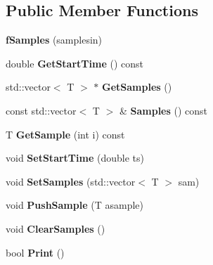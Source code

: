 \subsection*{Public Member Functions}
\begin{DoxyCompactItemize}
\item 
\hypertarget{classWaveform_a68f36ac9c005ddcbf426a62be2628620}{
{\bfseries fSamples} (samplesin)}
\label{classWaveform_a68f36ac9c005ddcbf426a62be2628620}

\item 
\hypertarget{classWaveform_abb0cebd383b7cfeb84169acb75dd3cc6}{
double {\bfseries GetStartTime} () const }
\label{classWaveform_abb0cebd383b7cfeb84169acb75dd3cc6}

\item 
\hypertarget{classWaveform_a4f146530e8336f402b1d47a2b1b0fae8}{
std::vector$<$ T $>$ $\ast$ {\bfseries GetSamples} ()}
\label{classWaveform_a4f146530e8336f402b1d47a2b1b0fae8}

\item 
\hypertarget{classWaveform_ac43b148d094b815f0eab3e516a0159c3}{
const std::vector$<$ T $>$ \& {\bfseries Samples} () const }
\label{classWaveform_ac43b148d094b815f0eab3e516a0159c3}

\item 
\hypertarget{classWaveform_a93fd6a1de144622e55fa1144159fd8da}{
T {\bfseries GetSample} (int i) const }
\label{classWaveform_a93fd6a1de144622e55fa1144159fd8da}

\item 
\hypertarget{classWaveform_ad8b5b17cc6d44e528abdd97adead95d4}{
void {\bfseries SetStartTime} (double ts)}
\label{classWaveform_ad8b5b17cc6d44e528abdd97adead95d4}

\item 
\hypertarget{classWaveform_a5505b4a4e14e80edb335b71e3606d815}{
void {\bfseries SetSamples} (std::vector$<$ T $>$ sam)}
\label{classWaveform_a5505b4a4e14e80edb335b71e3606d815}

\item 
\hypertarget{classWaveform_a09d5b4af62453d4a2d0bdbc5c04d9961}{
void {\bfseries PushSample} (T asample)}
\label{classWaveform_a09d5b4af62453d4a2d0bdbc5c04d9961}

\item 
\hypertarget{classWaveform_a9607cc7f4438c86663662ade5093f0f6}{
void {\bfseries ClearSamples} ()}
\label{classWaveform_a9607cc7f4438c86663662ade5093f0f6}

\item 
\hypertarget{classWaveform_a65c4764c140a15fbc60568465663fe39}{
bool {\bfseries Print} ()}
\label{classWaveform_a65c4764c140a15fbc60568465663fe39}

\end{DoxyCompactItemize}
